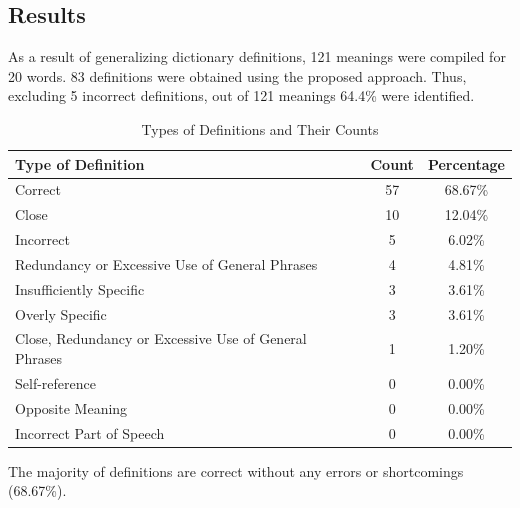 \documentclass[a0,portrait]{a0poster}
\begin{document}
\begin{multicols}{2}

\subsection*{Results}

As a result of generalizing dictionary definitions, 121 meanings were compiled for 20 words.
83 definitions were obtained using the proposed approach.
Thus, excluding 5 incorrect definitions, out of 121 meanings 64.4\% were identified.

\begin{table}[H]
\centering
\label{tab:definitions_classification}
\begin{tabular}{|>{\raggedright\arraybackslash}p{20cm}|c|c|}
\hline
\textbf{Type of Definition} & \textbf{Count} & \textbf{Percentage} \\ \hline
Correct & 57 & 68.67\% \\ \hline
Close & 10 & 12.04\% \\ \hline
Incorrect & 5 & 6.02\% \\ \hline
Redundancy or Excessive Use of General Phrases & 4 & 4.81\% \\ \hline
Insufficiently Specific & 3 & 3.61\% \\ \hline
Overly Specific & 3 & 3.61\% \\ \hline
Close, Redundancy or Excessive Use of General Phrases & 1 & 1.20\% \\ \hline
Self-reference & 0 & 0.00\% \\ \hline
Opposite Meaning & 0 & 0.00\% \\ \hline
Incorrect Part of Speech & 0 & 0.00\% \\ \hline
\end{tabular}
\caption{Types of Definitions and Their Counts}
\end{table}

The majority of definitions are correct without any errors or shortcomings (68.67\%).

%


\end{multicols}
\end{document}
